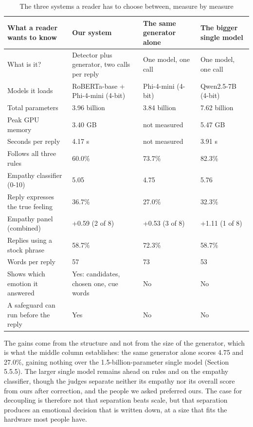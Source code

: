 \begin{table}[htbp]
\centering
\footnotesize
\begin{tabularx}{\textwidth}{@{}lXXX@{}}
\toprule
\textbf{What a reader wants to know} & \textbf{Our system} & \textbf{The same generator alone} & \textbf{The bigger single model} \\
\midrule
What is it? & Detector plus generator, two calls per reply & One model, one call & One model, one call \\
Models it loads & RoBERTa-base + Phi-4-mini (4-bit) & Phi-4-mini (4-bit) & Qwen2.5-7B (4-bit) \\
Total parameters & 3.96 billion & 3.84 billion & 7.62 billion \\
Peak GPU memory & 3.40 GB & not measured & 5.47 GB \\
Seconds per reply & 4.17 s & not measured & 3.91 s \\
Follows all three rules & 60.0\% & 73.7\% & 82.3\% \\
Empathy classifier (0-10) & 5.05 & 4.75 & 5.76 \\
Reply expresses the true feeling & 36.7\% & 27.0\% & 32.3\% \\
Empathy panel (combined) & +0.59 (2 of 8) & +0.53 (3 of 8) & +1.11 (1 of 8) \\
Replies using a stock phrase & 58.7\% & 72.3\% & 58.7\% \\
Words per reply & 57 & 73 & 53 \\
Shows which emotion it answered & Yes: candidates, chosen one, cue words & No & No \\
A safeguard can run before the reply & Yes & No & No \\
\bottomrule
\end{tabularx}
\caption{The three systems a reader has to choose between, measure by measure}
\label{tab:5.6}
\end{table}

The gains come from the structure and not from the size of the generator, which is what the middle column establishes: the same generator alone scores 4.75 and 27.0\%, gaining nothing over the 1.5-billion-parameter single model (Section 5.5.5). The larger single model remains ahead on rules and on the empathy classifier, though the judges separate neither its empathy nor its overall score from ours after correction, and the people we asked preferred ours. The case for decoupling is therefore not that separation beats scale, but that separation produces an emotional decision that is written down, at a size that fits the hardware most people have.

